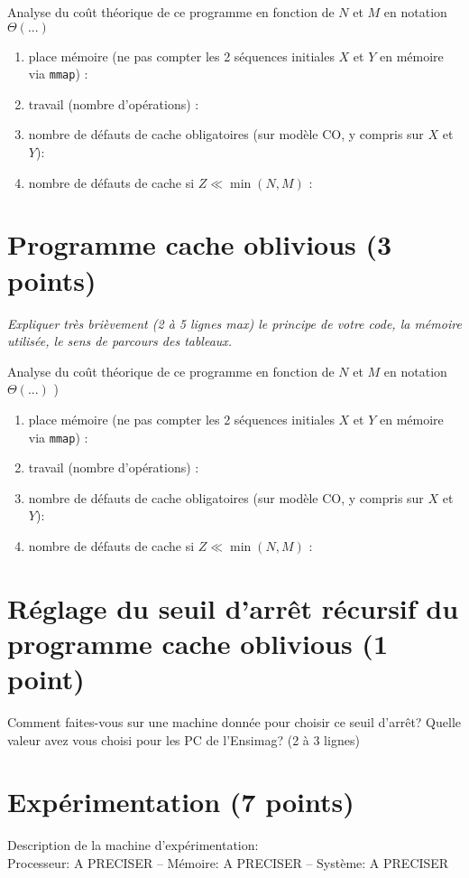\documentclass[10pt,a4paper]{article}
\begin{document}
Analyse du coût théorique de ce  programme en fonction de $N$ et $M$  en notation $\Theta(...)$ 
\begin{enumerate}
  \item place mémoire (ne pas compter les 2 séquences initiales $X$ et $Y$ en mémoire via {\tt mmap}) : 
  \item travail (nombre d'opérations) : 
  \item nombre de défauts de cache obligatoires (sur modèle CO, y compris sur $X$ et $Y$):
  \item nombre de défauts de cache si $Z \ll \min(N,M)$ : 
\end{enumerate}

\section{Programme cache oblivious  (3 points)}
{\em Expliquer très brièvement (2 à 5 lignes max) le principe de votre code, la mémoire utilisée, le sens de parcours des tableaux.}
\vspace*{1.0cm}

Analyse du coût théorique de ce  programme en fonction de $N$ et $M$  en notation $\Theta(...)$ )
\begin{enumerate}
  \item place mémoire (ne pas compter les 2 séquences initiales $X$ et $Y$ en mémoire via {\tt mmap}) : 
  \item travail (nombre d'opérations) : 
  \item nombre de défauts de cache obligatoires (sur modèle CO, y compris sur $X$ et $Y$):
  \item nombre de défauts de cache si $Z \ll \min(N,M)$ : 
\end{enumerate}

\section{Réglage du seuil d'arrêt récursif du programme cache oblivious  (1 point)} 
Comment faites-vous sur une machine donnée pour choisir ce seuil d'arrêt? Quelle valeur avez vous choisi pour les
PC de l'Ensimag? (2 à 3 lignes) 

\section{Expérimentation (7 points)}

Description de la machine d'expérimentation:  \\
Processeur: A PRECISER  --
Mémoire: A PRECISER --
Système: A PRECISER 
\end{document}
